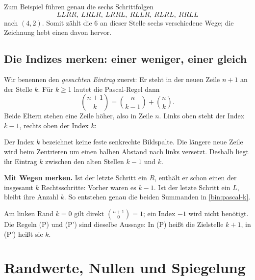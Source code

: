 Zum Beispiel führen genau die sechs Schrittfolgen
\[
 LLRR,\ LRLR,\ LRRL,\ RLLR,\ RLRL,\ RRLL
\]
nach $(4,2)$. Somit zählt die $6$ an dieser Stelle sechs verschiedene
Wege; die Zeichnung hebt einen davon hervor.

\subsection{Die Indizes merken: einer weniger, einer gleich}
\label{bin:indices}

Wir benennen den \emph{gesuchten Eintrag} zuerst: Er steht in der neuen
Zeile $n+1$ an der Stelle $k$. Für $k\ge1$ lautet die Pascal-Regel dann
\begin{equation}\tag{P'}\label{bin:pascal-k}
 \boxed{\displaystyle
 \binom{n+1}k=\binom n{k-1}+\binom nk.}
\end{equation}
Beide Eltern stehen eine Zeile höher, also in Zeile $n$.
Links oben steht der Index $k-1$, rechts oben der Index $k$:
\begin{center}\PascalEltern\end{center}

Der Index $k$ bezeichnet keine feste senkrechte Bildspalte.
Die längere neue Zeile wird beim Zentrieren um einen halben Abstand
nach links versetzt. Deshalb liegt ihr Eintrag $k$ zwischen den alten
Stellen $k-1$ und $k$.

\textbf{Mit Wegen merken.} Ist der letzte Schritt ein $R$, enthält er
schon einen der insgesamt $k$ Rechtsschritte: Vorher waren es $k-1$.
Ist der letzte Schritt ein $L$, bleibt ihre Anzahl $k$.
So entstehen genau die beiden Summanden in \eqref{bin:pascal-k}.

\medskip
\noindent{}

Am linken Rand $k=0$ gilt direkt $\binom{n+1}0=1$; ein Index $-1$
wird nicht benötigt. Die Regeln (P) und (P') sind dieselbe Aussage:
In (P) heißt die Zielstelle $k+1$, in (P') heißt sie $k$.

\section{Randwerte, Nullen und Spiegelung}
\label{bin:basic}

